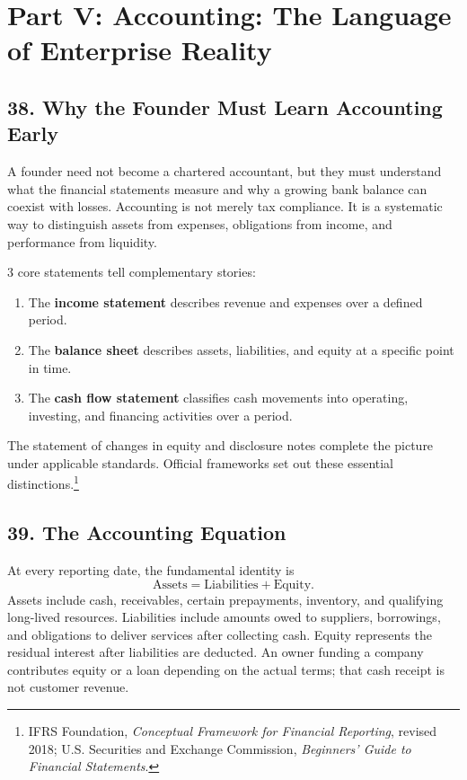 \section*{Part V: Accounting: The Language of Enterprise Reality}

\subsection*{38. Why the Founder Must Learn Accounting Early}

A founder need not become a chartered accountant, but they must understand what the financial statements measure and why a growing bank balance can coexist with losses. Accounting is not merely tax compliance. It is a systematic way to distinguish assets from expenses, obligations from income, and performance from liquidity.

3 core statements tell complementary stories:
\begin{enumerate}
  \item The \textbf{income statement} describes revenue and expenses over a defined period.
  \item The \textbf{balance sheet} describes assets, liabilities, and equity at a specific point in time.
  \item The \textbf{cash flow statement} classifies cash movements into operating, investing, and financing activities over a period.
\end{enumerate}
The statement of changes in equity and disclosure notes complete the picture under applicable standards. Official frameworks set out these essential distinctions.\footnote{IFRS Foundation, \emph{Conceptual Framework for Financial Reporting}, revised 2018; U.S. Securities and Exchange Commission, \emph{Beginners' Guide to Financial Statements}.}

\subsection*{39. The Accounting Equation}

At every reporting date, the fundamental identity is
\begin{equation}
\boxed{\text{Assets} = \text{Liabilities} + \text{Equity}}.
\end{equation}
Assets include cash, receivables, certain prepayments, inventory, and qualifying long-lived resources. Liabilities include amounts owed to suppliers, borrowings, and obligations to deliver services after collecting cash. Equity represents the residual interest after liabilities are deducted. An owner funding a company contributes equity or a loan depending on the actual terms; that cash receipt is not customer revenue.

